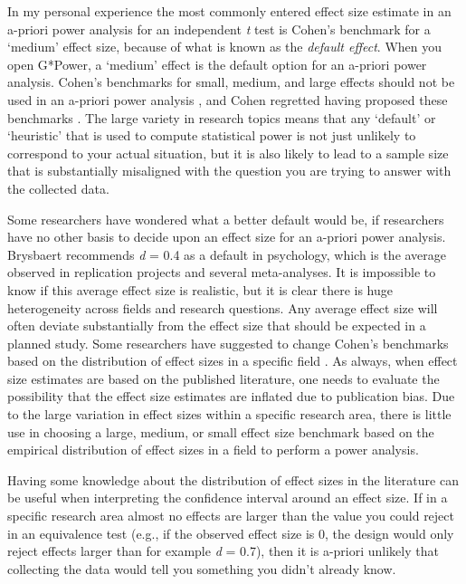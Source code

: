 \documentclass[
  oneside]{krantz}
\begin{document}
In my personal experience the most commonly entered effect size estimate in an a-priori power analysis for an independent \emph{t} test is Cohen's benchmark for a `medium' effect size, because of what is known as the \emph{default effect}. When you open G*Power, a `medium' effect is the default option for an a-priori power analysis. Cohen's benchmarks for small, medium, and large effects should not be used in an a-priori power analysis \citep{cook_assessing_2014, correll_avoid_2020}, and Cohen regretted having proposed these benchmarks \citep{funder_evaluating_2019}. The large variety in research topics means that any `default' or `heuristic' that is used to compute statistical power is not just unlikely to correspond to your actual situation, but it is also likely to lead to a sample size that is substantially misaligned with the question you are trying to answer with the collected data.

Some researchers have wondered what a better default would be, if researchers have no other basis to decide upon an effect size for an a-priori power analysis. Brysbaert \citeyearpar{brysbaert_how_2019} recommends \emph{d} = 0.4 as a default in psychology, which is the average observed in replication projects and several meta-analyses. It is impossible to know if this average effect size is realistic, but it is clear there is huge heterogeneity across fields and research questions. Any average effect size will often deviate substantially from the effect size that should be expected in a planned study. Some researchers have suggested to change Cohen's benchmarks based on the distribution of effect sizes in a specific field \citep{bosco_correlational_2015, hill_empirical_2008, kraft_interpreting_2020, lovakov_empirically_2017, funder_evaluating_2019}. As always, when effect size estimates are based on the published literature, one needs to evaluate the possibility that the effect size estimates are inflated due to publication bias. Due to the large variation in effect sizes within a specific research area, there is little use in choosing a large, medium, or small effect size benchmark based on the empirical distribution of effect sizes in a field to perform a power analysis.

Having some knowledge about the distribution of effect sizes in the literature can be useful when interpreting the confidence interval around an effect size. If in a specific research area almost no effects are larger than the value you could reject in an equivalence test (e.g., if the observed effect size is 0, the design would only reject effects larger than for example \emph{d} = 0.7), then it is a-priori unlikely that collecting the data would tell you something you didn't already know.
\end{document}
